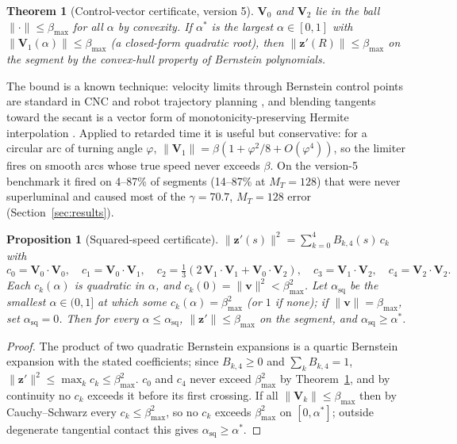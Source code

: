 \documentclass[11pt, a4paper]{article}
\newtheorem{theorem}{Theorem}
\newtheorem{proposition}{Proposition}
\begin{document}
\begin{theorem}[Control-vector certificate, version 5]\label{thm:ctrl}
$\mathbf{V}_0$ and $\mathbf{V}_2$ lie in the ball $\|\cdot\| \le \beta_{\max}$ for all $\alpha$ by convexity. If $\alpha^*$ is the largest $\alpha \in [0,1]$ with $\|\mathbf{V}_1(\alpha)\| \le \beta_{\max}$ (a closed-form quadratic root), then $\|\mathbf{z}'(R)\| \le \beta_{\max}$ on the segment by the convex-hull property of Bernstein polynomials.
\end{theorem}

The bound is a known technique: velocity limits through Bernstein control points are standard in CNC and robot trajectory planning \cite{farouki2008, tordesillas2020}, and blending tangents toward the secant is a vector form of monotonicity-preserving Hermite interpolation \cite{fritsch1980}. Applied to retarded time it is useful but conservative: for a circular arc of turning angle $\varphi$, $\|\mathbf{V}_1\| = \beta(1 + \varphi^2/8 + O(\varphi^4))$, so the limiter fires on smooth arcs whose true speed never exceeds $\beta$. On the version-5 benchmark it fired on 4--87\% of segments (14--87\% at $M_T = 128$) that were never superluminal and caused most of the $\gamma = 70.7$, $M_T = 128$ error (Section~\ref{sec:results}).

\begin{proposition}[Squared-speed certificate]\label{prop:sq}
$\|\mathbf{z}'(s)\|^2 = \sum_{k=0}^{4} B_{k,4}(s)\,c_k$ with
\[
c_0 = \mathbf{V}_0\!\cdot\!\mathbf{V}_0,\quad c_1 = \mathbf{V}_0\!\cdot\!\mathbf{V}_1,\quad c_2 = \tfrac13\left(2\,\mathbf{V}_1\!\cdot\!\mathbf{V}_1 + \mathbf{V}_0\!\cdot\!\mathbf{V}_2\right),\quad c_3 = \mathbf{V}_1\!\cdot\!\mathbf{V}_2,\quad c_4 = \mathbf{V}_2\!\cdot\!\mathbf{V}_2 .
\]
Each $c_k(\alpha)$ is quadratic in $\alpha$, and $c_k(0) = \|\mathbf{v}\|^2 < \beta_{\max}^2$. Let $\alpha_{\text{sq}}$ be the smallest $\alpha \in (0, 1]$ at which some $c_k(\alpha) = \beta_{\max}^2$ (or $1$ if none); if $\|\mathbf{v}\| = \beta_{\max}$, set $\alpha_{\text{sq}} = 0$. Then for every $\alpha \le \alpha_{\text{sq}}$, $\|\mathbf{z}'\| \le \beta_{\max}$ on the segment, and $\alpha_{\text{sq}} \ge \alpha^*$.
\end{proposition}
\begin{proof}
The product of two quadratic Bernstein expansions is a quartic Bernstein expansion with the stated coefficients; since $B_{k,4} \ge 0$ and $\sum_k B_{k,4} = 1$, $\|\mathbf{z}'\|^2 \le \max_k c_k \le \beta_{\max}^2$. $c_0$ and $c_4$ never exceed $\beta_{\max}^2$ by Theorem~\ref{thm:ctrl}, and by continuity no $c_k$ exceeds it before its first crossing. If all $\|\mathbf{V}_k\| \le \beta_{\max}$ then by Cauchy--Schwarz every $c_k \le \beta_{\max}^2$, so no $c_k$ exceeds $\beta_{\max}^2$ on $[0, \alpha^*]$; outside degenerate tangential contact this gives $\alpha_{\text{sq}} \ge \alpha^*$.
\end{proof}
\end{document}
